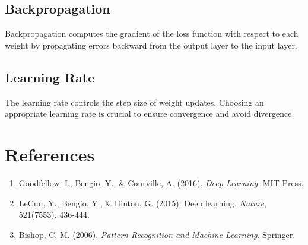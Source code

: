 \documentclass[a4paper,12pt]{article}
\begin{document}
\subsection{Backpropagation}
Backpropagation computes the gradient of the loss function with respect to each weight by propagating 
errors backward from the output layer to the input layer.

\subsection{Learning Rate}
The learning rate controls the step size of weight updates. Choosing an appropriate learning rate is 
crucial to ensure convergence and avoid divergence.

\section{References}
\begin{enumerate}
  \item Goodfellow, I., Bengio, Y., \& Courville, A. (2016). \textit{Deep Learning}. MIT Press.
  \item LeCun, Y., Bengio, Y., \& Hinton, G. (2015). Deep learning. \textit{Nature}, 521(7553), 436-444.
  \item Bishop, C. M. (2006). \textit{Pattern Recognition and Machine Learning}. Springer.
\end{enumerate}
\end{document}
